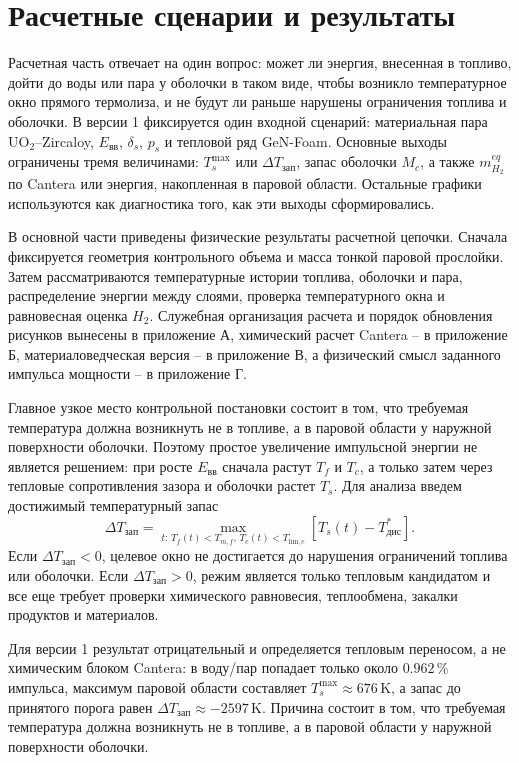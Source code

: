 \documentclass[12pt]{article}
\begin{document}
\section{Расчетные сценарии и результаты}

Расчетная часть отвечает на один вопрос: может ли энергия, внесенная в топливо, дойти до воды или пара у оболочки в таком виде, чтобы возникло температурное окно прямого термолиза, и не будут ли раньше нарушены ограничения топлива и оболочки. В версии 1 фиксируется один входной сценарий: материальная пара \(\mathrm{UO_2}\)--Zircaloy, \(E_{\mathrm{вв}}\), \(\delta_s\), \(p_s\) и тепловой ряд GeN-Foam. Основные выходы ограничены тремя величинами: \(T_s^{\max}\) или \(\Delta T_{\mathrm{зап}}\), запас оболочки \(M_c\), а также \(m_{H_2}^{eq}\) по Cantera или энергия, накопленная в паровой области. Остальные графики используются как диагностика того, как эти выходы сформировались.

В основной части приведены физические результаты расчетной цепочки. Сначала фиксируется геометрия контрольного объема и масса тонкой паровой прослойки. Затем рассматриваются температурные истории топлива, оболочки и пара, распределение энергии между слоями, проверка температурного окна и равновесная оценка \(H_2\). Служебная организация расчета и порядок обновления рисунков вынесены в приложение А, химический расчет Cantera -- в приложение Б, материаловедческая версия -- в приложение В, а физический смысл заданного импульса мощности -- в приложение Г.



Главное узкое место контрольной постановки состоит в том, что требуемая температура должна возникнуть не в топливе, а в паровой области у наружной поверхности оболочки. Поэтому простое увеличение импульсной энергии не является решением: при росте \(E_{\mathrm{вв}}\) сначала растут \(T_f\) и \(T_c\), а только затем через тепловые сопротивления зазора и оболочки растет \(T_s\). Для анализа введем достижимый температурный запас
\[
\Delta T_{\mathrm{зап}}=
\max_{t:\,T_f(t)<T_{m,f},\,T_c(t)<T_{\mathrm{lim},c}}
\left[T_s(t)-T^*_{\mathrm{дис}}\right].
\]
Если \(\Delta T_{\mathrm{зап}}<0\), целевое окно не достигается до нарушения ограничений топлива или оболочки. Если \(\Delta T_{\mathrm{зап}}>0\), режим является только тепловым кандидатом и все еще требует проверки химического равновесия, теплообмена, закалки продуктов и материалов.

Для версии 1 результат отрицательный и определяется тепловым переносом, а не химическим блоком Cantera: в воду/пар попадает только около \(0.962\,\%\) импульса, максимум паровой области составляет \(T_s^{\max}\approx676\,\mathrm{K}\), а запас до принятого порога равен \(\Delta T_{\mathrm{зап}}\approx-2597\,\mathrm{K}\). Причина состоит в том, что требуемая температура должна возникнуть не в топливе, а в паровой области у наружной поверхности оболочки.
\end{document}
